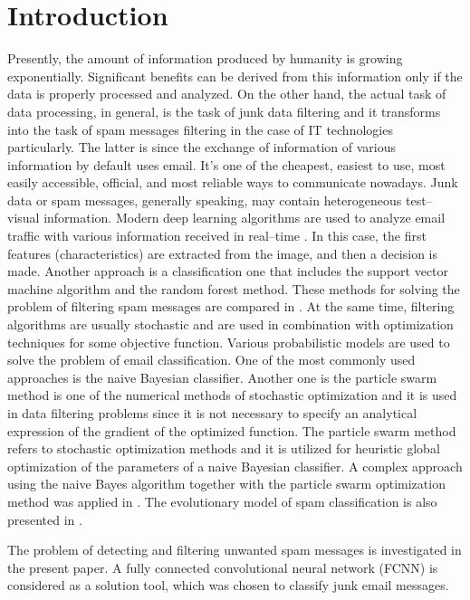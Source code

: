 \documentclass[a4paper]{jpconf}
\begin{document}
\section{Introduction}
Presently, the amount of information produced by humanity
is growing exponentially. Significant benefits can be derived from this information only if the data is properly processed and analyzed.
On the other hand, the actual task of data processing, in general, is the task of junk data filtering and it transforms into the task of spam messages filtering in the case of IT technologies particularly.
The latter is since the exchange of information of various information by default uses email. It's one of the cheapest, easiest to use, most easily accessible, official, and most reliable ways to communicate nowadays.
Junk data or spam messages, generally speaking, may contain heterogeneous test--visual information. Modern deep
learning algorithms are used to analyze email traffic with various information received in real--time \cite{Makkar2021}.
In this case, the first features (characteristics) are extracted from the image, and then a decision is made.
Another approach is a classification one that includes the support vector machine algorithm and the random forest method. These methods for solving the problem of filtering spam messages are compared in \cite{Taylor2020}.
At the same time, filtering algorithms are usually stochastic \cite{Garg2021} and are used in combination with optimization techniques for some objective function. Various probabilistic models are used to solve the problem of email classification. One of the most commonly used approaches is the naive Bayesian classifier. Another one is the particle swarm method is one of the numerical methods of stochastic optimization and it is used in data filtering problems since it is not necessary to specify an analytical expression of the gradient of the optimized function. The particle swarm method refers to stochastic optimization methods and it is utilized for heuristic global optimization of the parameters of a naive Bayesian classifier. A complex approach using the naive Bayes algorithm together with the particle swarm optimization method was applied in \cite{Parmar2020}.
The evolutionary model of spam classification is also presented in \cite{Mohammad2020}.

The problem of detecting and filtering unwanted spam messages is investigated in the present paper. A fully connected convolutional neural network ({FCNN}) is considered as a solution tool, which was chosen to classify junk email messages.
\end{document}

